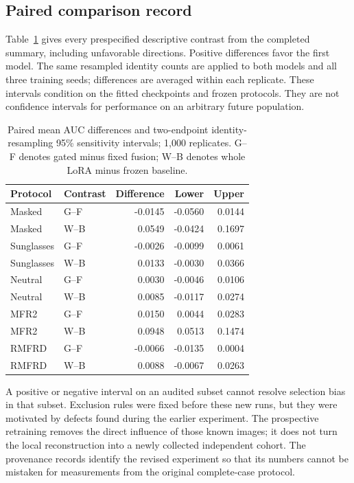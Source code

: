 \documentclass[10pt,journal,compsoc]{IEEEtran}
\begin{document}
\subsection{Paired comparison record}
Table~\ref{tab:paired} gives every prespecified descriptive contrast from the completed summary, including unfavorable directions. Positive differences favor the first model. The same resampled identity counts are applied to both models and all three training seeds; differences are averaged within each replicate. These intervals condition on the fitted checkpoints and frozen protocols. They are not confidence intervals for performance on an arbitrary future population.
\begin{table}[t]
\centering
\caption{Paired mean AUC differences and two-endpoint identity-resampling 95\% sensitivity intervals; 1,000 replicates. G--F denotes gated minus fixed fusion; W--B denotes whole LoRA minus frozen baseline.}
\label{tab:paired}
\begin{tabular}{llrrr}
\toprule
Protocol & Contrast & Difference & Lower & Upper\\
\midrule
Masked & G--F & -0.0145 & -0.0560 & 0.0144\\
Masked & W--B & 0.0549 & -0.0424 & 0.1697\\
Sunglasses & G--F & -0.0026 & -0.0099 & 0.0061\\
Sunglasses & W--B & 0.0133 & -0.0030 & 0.0366\\
Neutral & G--F & 0.0030 & -0.0046 & 0.0106\\
Neutral & W--B & 0.0085 & -0.0117 & 0.0274\\
MFR2 & G--F & 0.0150 & 0.0044 & 0.0283\\
MFR2 & W--B & 0.0948 & 0.0513 & 0.1474\\
RMFRD & G--F & -0.0066 & -0.0135 & 0.0004\\
RMFRD & W--B & 0.0088 & -0.0067 & 0.0263\\
\bottomrule
\end{tabular}
\end{table}
A positive or negative interval on an audited subset cannot resolve selection bias in that subset. Exclusion rules were fixed before these new runs, but they were motivated by defects found during the earlier experiment. The prospective retraining removes the direct influence of those known images; it does not turn the local reconstruction into a newly collected independent cohort. The provenance records identify the revised experiment so that its numbers cannot be mistaken for measurements from the original complete-case protocol.
\end{document}
